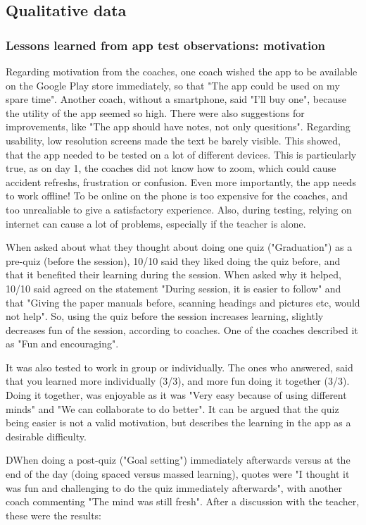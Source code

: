 \subsection{Qualitative data}

\subsubsection{Lessons learned from app test observations: motivation}
Regarding motivation from the coaches, one coach wished the app to be available on the Google Play store immediately, so that "The app could be used on my spare time". Another coach, without a smartphone, said "I'll buy one", because the utility of the app seemed so high. There were also suggestions for improvements, like "The app should have notes, not only quesitions". Regarding usability, low resolution screens made the text be barely visible. This showed, that the app needed to be tested on a lot of different devices. This is particularly true, as on day 1, the coaches did not know how to zoom, which could cause accident refreshs, frustration or confusion. Even more importantly, the app needs to work offline! To be online on the phone is too expensive for the coaches, and too unrealiable to give a satisfactory experience. Also, during testing, relying on internet can cause a lot of problems, especially if the teacher is alone.

When asked about what they thought about doing one quiz ("Graduation") as a pre-quiz (before the session), 10/10 said they liked doing the quiz before, and that it benefited their learning during the session. When asked why it helped, 10/10 said agreed on the statement "During session, it is easier to follow" and that "Giving the paper manuals before, scanning headings and pictures etc, would not help". So, using the quiz before the session increases learning, slightly decreases fun of the session, according to coaches. One of the coaches described it as "Fun and encouraging".

    It was also tested to work in group or individually. The ones who answered, said that you learned more individually (3/3), and more fun doing it together (3/3). Doing it together, was enjoyable as it was "Very easy because of using different minds" and "We can collaborate to do better". It can be argued that the quiz being easier is not a valid motivation, but describes the learning in the app as a desirable difficulty.

    DWhen doing a post-quiz ("Goal setting") immediately afterwards versus at the end of the day (doing spaced versus massed learning), quotes were "I thought it was fun and challenging to do the quiz immediately afterwards", with another coach commenting "The mind was still fresh". After a discussion with the teacher, these were the results:

